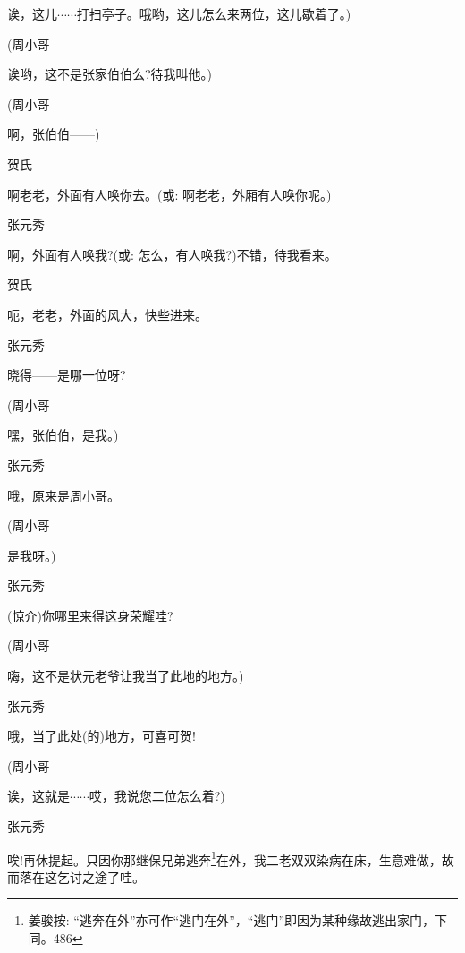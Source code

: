 诶，这儿$\cdots{}\cdots{}$打扫亭子。哦哟，这儿怎么来两位，这儿歇着了。)

(周小哥\hspace{20pt}~

诶哟，这不是张家伯伯么?待我叫他。)

(周小哥\hspace{20pt}~

啊，张伯伯------)

贺氏\hspace{30pt}~

啊老老，外面有人唤你去。({\akai 或}: 啊老老，外厢有人唤你呢。)

张元秀\hspace{20pt}~

啊，外面有人唤我?({\akai 或}: 怎么，有人唤我?)不错，待我看来。

贺氏\hspace{30pt}~

呃，老老，外面的风大，快些进来。

张元秀\hspace{20pt}~

晓得------是哪一位呀?

(周小哥\hspace{20pt}~

嘿，张伯伯，是我。)

张元秀\hspace{20pt}~

哦，原来是周小哥。

(周小哥\hspace{20pt}~

是我呀。)

张元秀\hspace{20pt}~

(惊介)你哪里来得这身荣耀哇?

(周小哥\hspace{20pt}~

嗨，这不是状元老爷让我当了此地的地方。)

张元秀\hspace{20pt}~

哦，当了此处(的)地方，可喜可贺!

(周小哥\hspace{20pt}~

诶，这就是$\cdots{}\cdots{}$哎，我说您二位怎么着?)

张元秀

唉!再休提起。只因你那继保兄弟逃奔\footnote{ 姜骏按: ``逃奔在外''亦可作``逃门在外''，``逃门''即因为某种缘故逃出家门，下同。{486}}在外，我二老双双染病在床，生意难做，故而落在这乞讨之途了哇。


